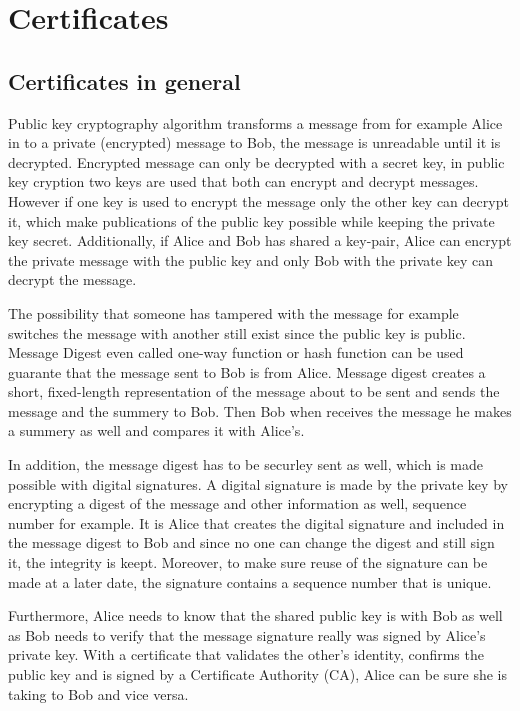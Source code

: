 \section{Certificates}
\subsection{Certificates in general}

Public key cryptography algorithm transforms a message from for example Alice in to a private (encrypted) message to Bob, 
the message is unreadable until it is decrypted. 
Encrypted message can only be decrypted with a secret key, in public key cryption two keys are used that both can encrypt and 
decrypt messages. 
However if one key is used to encrypt the message only the other key can decrypt it, which make publications of the public key 
possible while keeping the private key secret. 
Additionally, if Alice and Bob has shared a key-pair, Alice can encrypt the private message with the public key and only Bob 
with the private key can decrypt the message.

The possibility that someone has tampered with the message for example switches the message with another still exist since the public 
key is public. Message Digest even called one-way function or hash function can be used guarante that the message sent to Bob is 
from Alice. Message digest creates a short, fixed-length representation of the message about to be sent and sends the message and
the summery to Bob. Then Bob when receives the message he makes a summery as well and compares it with Alice's.

In addition, the message digest has to be securley sent as well, which is made possible with digital signatures. A digital signature
is made by the private key by encrypting a digest of the message and other information as well, sequence number for example.
It is Alice that creates the digital signature and included in the message digest to Bob and since no one can change the digest and still 
sign it, the integrity is keept. Moreover, to make sure reuse of the signature can be made at a later date, the signature contains a 
sequence number that is unique. 

Furthermore, Alice needs to know that the shared public key is with Bob as well as Bob needs to verify that the message signature 
really was signed by Alice's private key. With a certificate that validates the other's identity, confirms the public key and
is signed by a Certificate Authority (CA), Alice can be sure she is taking to Bob and vice versa.


